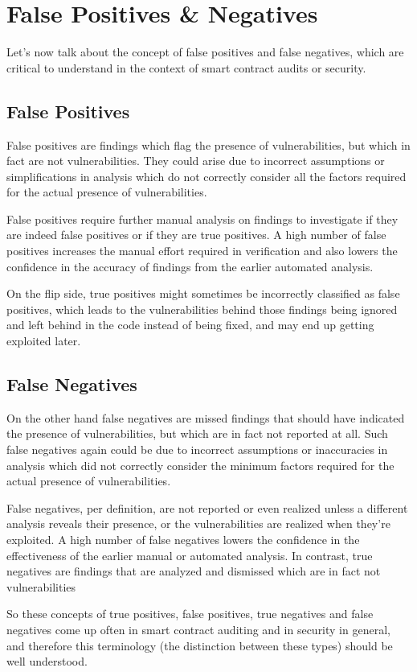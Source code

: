 \section{False Positives \& Negatives}\label{false-positives-negatives}

Let's now talk about the concept of false positives and false negatives,
which are critical to understand in the context of smart contract audits
or security.

\subsection{False Positives}\label{false-positives}

False positives are findings which flag the presence of vulnerabilities,
but which in fact are not vulnerabilities. They could arise due to
incorrect assumptions or simplifications in analysis which do not
correctly consider all the factors required for the actual presence of
vulnerabilities.

False positives require further manual analysis on findings to
investigate if they are indeed false positives or if they are true
positives. A high number of false positives increases the manual effort
required in verification and also lowers the confidence in the accuracy
of findings from the earlier automated analysis.

On the flip side, true positives might sometimes be incorrectly
classified as false positives, which leads to the vulnerabilities behind
those findings being ignored and left behind in the code instead of
being fixed, and may end up getting exploited later.

\subsection{False Negatives}\label{false-negatives}

On the other hand false negatives are missed findings that should have
indicated the presence of vulnerabilities, but which are in fact not
reported at all. Such false negatives again could be due to incorrect
assumptions or inaccuracies in analysis which did not correctly consider
the minimum factors required for the actual presence of vulnerabilities.

False negatives, per definition, are not reported or even realized
unless a different analysis reveals their presence, or the
vulnerabilities are realized when they're exploited. A high number of
false negatives lowers the confidence in the effectiveness of the
earlier manual or automated analysis. In contrast, true negatives are
findings that are analyzed and dismissed which are in fact not
vulnerabilities

So these concepts of true positives, false positives, true negatives and
false negatives come up often in smart contract auditing and in security
in general, and therefore this terminology (the distinction between
these types) should be well understood.
